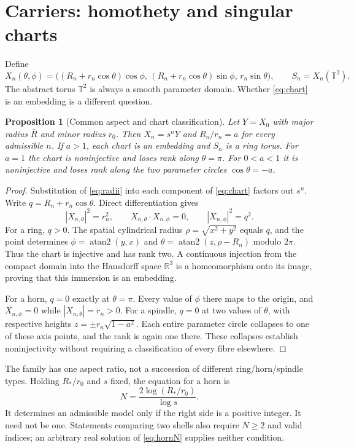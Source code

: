 \documentclass[11pt,a4paper]{article}
\newtheorem{proposition}[theorem]{Proposition}
\theoremstyle{definition}
\theoremstyle{remark}
\newcommand{\R}{\mathbb R}
\newcommand{\T}{\mathbb T}
\newcommand{\atan}{\operatorname{atan2}}
\begin{document}
\section{Carriers: homothety and singular charts}
\label{sec:carriers}
Define
\begin{equation}
 X_n(\theta,\phi)=
 \bigl((R_n+r_n\cos\theta)\cos\phi,\,
       (R_n+r_n\cos\theta)\sin\phi,\,
       r_n\sin\theta\bigr),\qquad S_n=X_n(\T^2).
 \label{eq:chart}
\end{equation}
The abstract torus $\T^2$ is always a smooth parameter domain.
Whether \eqref{eq:chart} is an embedding is a different question.

\begin{proposition}[Common aspect and chart classification]
\label{prop:homothety}
Let $Y=X_0$ with major radius $\bar R$ and minor radius $r_0$.
Then $X_n=s^nY$ and $R_n/r_n=a$ for every admissible $n$.
If $a>1$, each chart is an embedding and $S_n$ is a ring torus.
For $a=1$ the chart is noninjective and loses rank along
$\theta=\pi$. For $0<a<1$ it is noninjective and loses rank along
the two parameter circles $\cos\theta=-a$.
\end{proposition}
\begin{proof}
Substitution of \eqref{eq:radii} into each component of
\eqref{eq:chart} factors out $s^n$. Write
$q=R_n+r_n\cos\theta$. Direct differentiation gives
\begin{equation}
 |X_{n,\theta}|^2=r_n^2,\qquad
 X_{n,\theta}\cdot X_{n,\phi}=0,\qquad
 |X_{n,\phi}|^2=q^2.
 \label{eq:metric}
\end{equation}
For a ring, $q>0$. The spatial cylindrical radius
$\rho=\sqrt{x^2+y^2}$ equals $q$, and the point determines
$\phi=\atan(y,x)$ and
$\theta=\atan(z,\rho-R_n)$ modulo $2\pi$. Thus the chart is
injective and has rank two. A continuous injection from the compact
domain into the Hausdorff space $\R^3$ is a homeomorphism onto its
image, proving that this immersion is an embedding.

For a horn, $q=0$ exactly at $\theta=\pi$. Every value of $\phi$
there maps to the origin, and $X_{n,\phi}=0$ while
$|X_{n,\theta}|=r_n>0$. For a spindle, $q=0$ at two values of
$\theta$, with respective heights
$z=\pm r_n\sqrt{1-a^2}$. Each entire parameter circle collapses
to one of these axis points, and the rank is again one there.
These collapses establish noninjectivity without requiring a
classification of every fibre elsewhere.
\end{proof}

The family has one aspect ratio, not a succession of different
ring/horn/spindle types. Holding $R_*/r_0$ and $s$ fixed, the equation
for a horn is
\begin{equation}
 N=\frac{2\log(R_*/r_0)}{\log s}.
 \label{eq:hornN}
\end{equation}
It determines an admissible model only if the right side is a positive
integer. It need not be one. Statements comparing two shells also
require $N\geq2$ and valid indices; an arbitrary real solution of
\eqref{eq:hornN} supplies neither condition.
\end{document}
